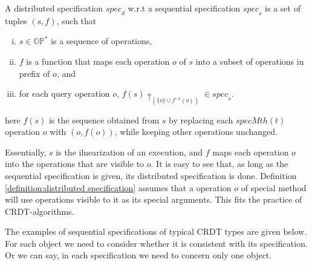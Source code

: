 
\begin{definition}
\label{definition:distributed specification}
A distributed specification $\mathit{spec}_d$ w.r.t a sequential specification $\mathit{spec}_s$ is a set of tuples $(s,f)$, such that

\begin{enumerate}[(i)]
\item $s \in \mathbb{OP}^*$ is a sequence of operations,
\item $f$ is a function that maps each operation $o$ of $s$ into a subset of operations in prefix of $o$, and
\item for each query operation $o$, $f(s) \uparrow_{ ( \{ o \} \cup f^{-1}(o))} \in \mathit{spec}_s$.
\end{enumerate}

here $f(s)$ is the sequence obtained from $s$ by replacing each $\mathit{specMth}(t)$ operation $o$ with $(o,f(o))$, while keeping other operations unchanged.
\end{definition}

Essentially, $s$ is the ilnearization of an execution, and $f$ maps each operation $o$ into the operations that are visible to $o$. It is easy to see that, as long as the sequential specification is given, its distributed specification is done. Definition \ref{definition:distributed specification} assumes that a operation $o$ of special method will use operations visible to it as its special arguments. This fits the practice of CRDT-algorithms.

The examples of sequential specifications of typical CRDT types are given below. For each object we need to consider whether it is consistent with its specification. Or we can say, in each specification we need to concern only one object. 

